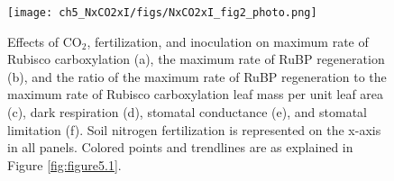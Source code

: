 \newpage
\begin{figure}
    \centering
    \texttt{[image: ch5\_NxCO2xI/figs/NxCO2xI\_fig2\_photo.png]}
    \caption[Effects of CO$_2$, fertilization, and inoculation on maximum rate of Rubisco carboxylation, the maximum rate of RuBP regeneration, and the ratio of the maximum rate of RuBP regeneration to the maximum rate of Rubisco carboxylation leaf mass per unit leaf area, dark respiration, stomatal conductance, and stomatal limitation]{Effects of CO$_2$, fertilization, and inoculation on maximum rate of Rubisco carboxylation (a), the maximum rate of RuBP regeneration (b), and the ratio of the maximum rate of RuBP regeneration to the maximum rate of Rubisco carboxylation leaf mass per unit leaf area (c), dark respiration (d), stomatal conductance (e), and stomatal limitation (f). Soil nitrogen fertilization is represented on the x-axis in all panels. Colored points and trendlines are as explained in Figure \ref{fig:figure5.1}.}
    \label{fig:figure5.2}
\end{figure}
\clearpage

